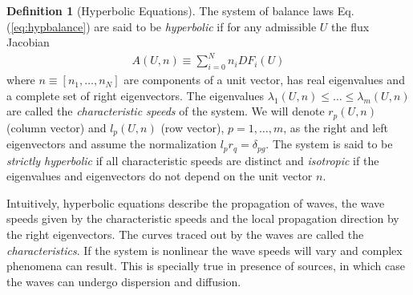 \documentclass[11pt, reqno]{amsart}
\newcommand{\eqr}[1]{Eq.\thinspace(#1)}
\theoremstyle{definition}
\newtheorem{dfn}{Definition}
\begin{document}
\begin{dfn}[Hyperbolic Equations]
  The system of balance laws \eqr{\ref{eq:hypbalance}} are said to be
  \emph{hyperbolic} if for any admissible $U$ the flux Jacobian
  \begin{align}
    A(U,n) \equiv \sum_{i=0}^N n_i DF_i(U)
  \end{align}
  where $n\equiv [n_1,\ldots,n_N]$ are components of a unit vector,
  has real eigenvalues and a complete set of right eigenvectors. The
  eigenvalues $\lambda_1(U,n) \le \ldots \le \lambda_m(U,n)$ are
  called the \emph{characteristic speeds} of the system. We will
  denote $r_p(U,n)$ (column vector) and $l_p(U,n)$ (row vector),
  $p=1,\ldots,m$, as the right and left eigenvectors and assume the
  normalization $l_p r_q = \delta_{pg}$.  The system is said to be
  \emph{strictly hyperbolic} if all characteristic speeds are distinct
  and \emph{isotropic} if the eigenvalues and eigenvectors do not
  depend on the unit vector $n$.
\end{dfn}

Intuitively, hyperbolic equations describe the propagation of waves,
the wave speeds given by the characteristic speeds and the local
propagation direction by the right eigenvectors. The curves traced out
by the waves are called the \emph{characteristics}. If the system is
nonlinear the wave speeds will vary and complex phenomena can
result. This is specially true in presence of sources, in which case
the waves can undergo dispersion and diffusion.
\end{document}
